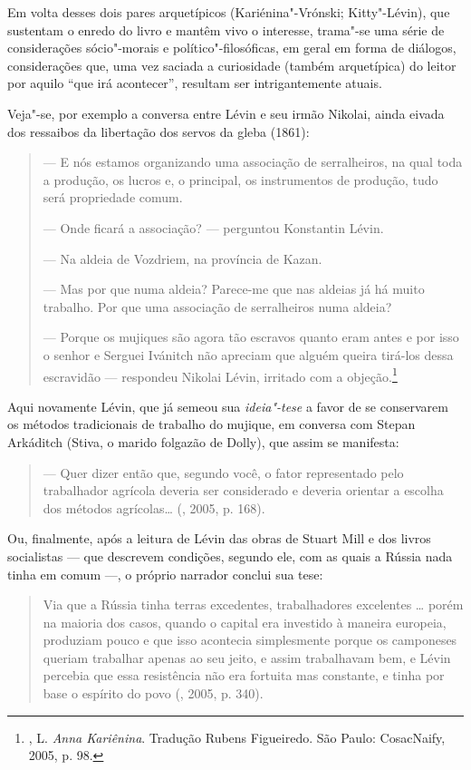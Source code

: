 Em volta desses dois pares arquetípicos (Kariénina"-Vrónski; Kitty"-Lévin), que sustentam o enredo do
livro e mantêm vivo o interesse, trama"-se uma série de considerações
sócio"-morais e político"-filosóficas, em geral em forma de diálogos, considerações que,
uma vez saciada a curiosidade (também arquetípica) do leitor por aquilo
``que irá acontecer'', resultam ser intrigantemente atuais.

Veja"-se, por exemplo a conversa entre Lévin e seu irmão Nikolai, ainda
eivada dos ressaibos da libertação dos servos da gleba (1861):

\begin{quotation}
--- E nós estamos organizando uma associação de serralheiros, na qual toda a produção, os
lucros e, o principal, os instrumentos de produção, tudo será propriedade comum.

--- Onde ficará a associação? --- perguntou Konstantin Lévin.

--- Na aldeia de Vozdriem, na província de Kazan.

--- Mas por que numa aldeia? Parece-me que nas aldeias
já há muito trabalho. Por que uma associação de serralheiros numa aldeia?

--- Porque os mujiques são agora tão escravos quanto
eram antes e por isso o senhor e Serguei Ivánitch não apreciam
que alguém queira tirá-los dessa escravidão --- respondeu Nikolai
Lévin, irritado com a objeção.\footnote{, L. \emph{Anna Kariênina}. Tradução Rubens Figueiredo. São Paulo: CosacNaify, 2005, p. 98.}
\end{quotation}

Aqui novamente Lévin, que já semeou sua \emph{ideia"-tese} a
favor de se conservarem os métodos tradicionais de trabalho do
mujique, em conversa com Stepan Arkáditch (Stiva, o marido folgazão de
Dolly), que assim se manifesta:

\begin{quotation}
--- Quer dizer então que, segundo você, o fator representado pelo
trabalhador agrícola deveria ser considerado e deveria orientar a
escolha dos métodos agrícolas\ldots{} (, 2005, p. 168).
\end{quotation}

Ou, finalmente, após a leitura de Lévin das obras de Stuart Mill e dos livros
socialistas --- que descrevem condições, segundo ele, com as
quais a Rússia nada tinha em comum ---, o próprio
narrador conclui sua tese:

\begin{quotation}
Via que a Rússia tinha terras excedentes, trabalhadores excelentes \ldots{}
porém na maioria dos casos, quando o capital era investido à maneira
europeia, produziam pouco e que isso
acontecia simplesmente porque os camponeses queriam trabalhar apenas ao
seu jeito, e assim trabalhavam bem, e Lévin percebia que essa
resistência não era fortuita mas constante, e tinha por base o espírito
do povo (, 2005, p. 340).
\end{quotation}

